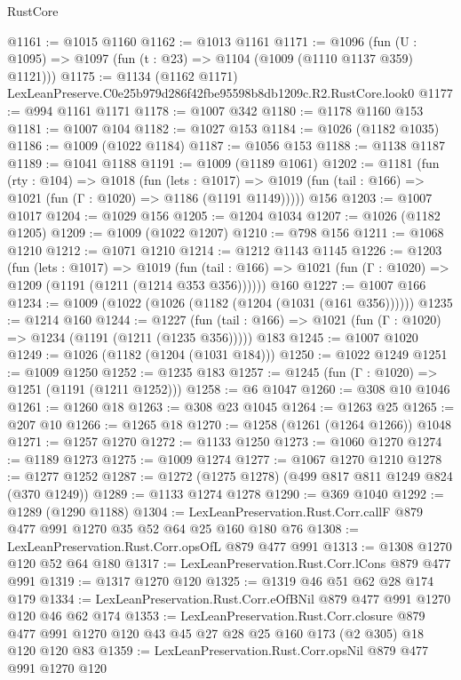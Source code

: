\begin{lexlean}{RustCore}
\begin{coremodule}
@1161 := @1015 @1160
@1162 := @1013 @1161
@1171 := @1096 (fun (U : @1095) => @1097 (fun (t : @23) => @1104 (@1009 (@1110 @1137 @359) @1121)))
@1175 := @1134 (@1162 @1171) LexLeanPreserve.C0e25b979d286f42fbe95598b8db1209c.R2.RustCore.look0
@1177 := @994 @1161 @1171
@1178 := @1007 @342
@1180 := @1178 @1160 @153
@1181 := @1007 @104
@1182 := @1027 @153
@1184 := @1026 (@1182 @1035)
@1186 := @1009 (@1022 @1184)
@1187 := @1056 @153
@1188 := @1138 @1187
@1189 := @1041 @1188
@1191 := @1009 (@1189 @1061)
@1202 := @1181
    (fun (rty : @104) =>
    @1018
      (fun (lets : @1017) =>
      @1019 (fun (tail : @166) => @1021 (fun (Γ : @1020) => @1186 (@1191 @1149)))))
    @156
@1203 := @1007 @1017
@1204 := @1029 @156
@1205 := @1204 @1034
@1207 := @1026 (@1182 @1205)
@1209 := @1009 (@1022 @1207)
@1210 := @798 @156
@1211 := @1068 @1210
@1212 := @1071 @1210
@1214 := @1212 @1143 @1145
@1226 := @1203
    (fun (lets : @1017) =>
    @1019 (fun (tail : @166) => @1021 (fun (Γ : @1020) => @1209 (@1191 (@1211 (@1214 @353 @356))))))
    @160
@1227 := @1007 @166
@1234 := @1009 (@1022 (@1026 (@1182 (@1204 (@1031 (@161 @356))))))
@1235 := @1214 @160
@1244 := @1227
    (fun (tail : @166) => @1021 (fun (Γ : @1020) => @1234 (@1191 (@1211 (@1235 @356)))))
    @183
@1245 := @1007 @1020
@1249 := @1026 (@1182 (@1204 (@1031 @184)))
@1250 := @1022 @1249
@1251 := @1009 @1250
@1252 := @1235 @183
@1257 := @1245 (fun (Γ : @1020) => @1251 (@1191 (@1211 @1252)))
@1258 := @6 @1047
@1260 := @308 @10 @1046
@1261 := @1260 @18
@1263 := @308 @23 @1045
@1264 := @1263 @25
@1265 := @207 @10
@1266 := @1265 @18
@1270 := @1258 (@1261 (@1264 @1266)) @1048
@1271 := @1257 @1270
@1272 := @1133 @1250
@1273 := @1060 @1270
@1274 := @1189 @1273
@1275 := @1009 @1274
@1277 := @1067 @1270 @1210
@1278 := @1277 @1252
@1287 := @1272 (@1275 @1278) (@499 @817 @811 @1249 @824 (@370 @1249))
@1289 := @1133 @1274 @1278
@1290 := @369 @1040
@1292 := @1289 (@1290 @1188)
@1304 := LexLeanPreservation.Rust.Corr.callF @879 @477 @991 @1270 @35 @52 @64 @25 @160 @180 @76
@1308 := LexLeanPreservation.Rust.Corr.opsOfL @879 @477 @991
@1313 := @1308 @1270 @120 @52 @64 @180
@1317 := LexLeanPreservation.Rust.Corr.lCons @879 @477 @991
@1319 := @1317 @1270 @120
@1325 := @1319 @46 @51 @62 @28 @174 @179
@1334 := LexLeanPreservation.Rust.Corr.eOfBNil @879 @477 @991 @1270 @120 @46 @62 @174
@1353 := LexLeanPreservation.Rust.Corr.closure
    @879
    @477
    @991
    @1270
    @120
    @43
    @45
    @27
    @28
    @25
    @160
    @173
    (@2 @305)
    @18
    @120
    @120
    @83
@1359 := LexLeanPreservation.Rust.Corr.opsNil @879 @477 @991 @1270 @120

\end{coremodule}
\end{lexlean}
